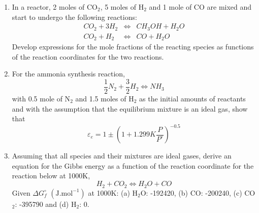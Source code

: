 \documentclass[12pts,a4paper,amsmath,amssymb,floatfix]{article}%
\newcommand{\frc}{\displaystyle\frac}
\begin{document}
\begin{enumerate}[label=\bfseries Problem \arabic*:]
\item\label{T0803} In a reactor, 2 moles of CO$_{2}$, 5 moles of H$_{2}$ and 1 mole of CO are mixed and start to undergo the following reactions:
\begin{eqnarray}
CO_{2} + 3 H_{2} &\Longleftrightarrow& CH_{3}OH + H_{2}O \nonumber \\
CO_{2} + H_{2} &\Longleftrightarrow& CO + H_{2}O\nonumber
\end{eqnarray}
Develop expressions for the mole fractions of the reacting species as functions of the reaction coordinates for the two reactions.

\item\label{T0901} For the ammonia synthesis reaction,
\begin{displaymath}
\frc{1}{2} N_{2}+ \frc{3}{2} H_{2} \Longleftrightarrow NH_{3}
\end{displaymath}
with 0.5 mole of N$_{2}$ and 1.5 moles of H$_{2}$ as the initial amounts of reactants and with the assumption that the equilibrium mixture is an ideal gas, show that
\begin{displaymath}
\varepsilon_{e} = 1 \pm \left( 1 + 1.299 K \frc{P}{P^{\circ}}\right)^{-0.5}
\end{displaymath}

\item\label{T0902} Assuming that all species and their mixtures are ideal gases, derive an equation for the Gibbs energy as a function of the reaction coordinate for the reaction below at 1000K,
\begin{displaymath}
H_{2} + CO_{2} \Longleftrightarrow H_{2}O + CO
\end{displaymath}
Given $\Delta G_{f}^{\circ}$ $\left(\text{J.mol}^{-1}\right)$ at 1000K: (a) H$_{2}$O: -192420, (b) CO: -200240, (c) CO$_{2}$: -395790 and (d) H$_{2}$: 0.


\end{enumerate}
\end{document}
